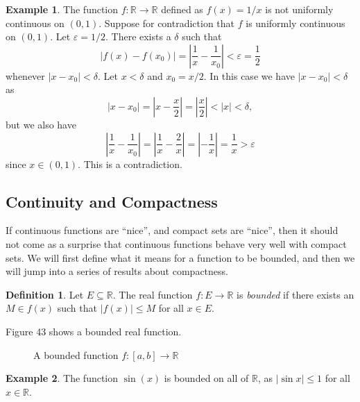 \documentclass{article}
\newcommand{\R}{\mathbb{R}}
\newcommand{\abs}[1]{\left\lvert#1\right\rvert}
\theoremstyle{definition}
\newtheorem{definition}{Definition}[section]
\newtheorem{example}{Example}[section]
\begin{document}
	\begin{example}
		The function $ f:\R\to\R $ defined as $ f(x)=1/x $ is not uniformly continuous on $ (0,1) $. Suppose for contradiction that $ f $ is uniformly continuous on $ (0,1) $. Let $ \varepsilon=1/2 $. There exists a $ \delta $ such that $$ |f(x)-f(x_0)|=\left\lvert\frac{1}{x}-\frac{1}{x_0}\right\rvert<\varepsilon=\frac{1}{2} $$ whenever $\abs{x - x_0} < \delta$. Let $x < \delta$ and $x_0 = x/2$. In this case we have $|x-x_0|<\delta$ as 
		$$ \abs{x-x_0}=\abs{x-\frac{x}{2}} = \abs{\frac{x}{2}} < \abs{x} < \delta,$$ but we also have  
		$$ \left\lvert\frac{1}{x}-\frac{1}{x_0}\right\rvert = \left\lvert\frac{1}{x}-\frac{2}{x}\right\rvert = \abs{-\frac{1}{x}} = \frac{1}{x} > \varepsilon$$ since $x\in (0,1)$. This is a contradiction.
	\end{example}
	\subsection{Continuity and Compactness}
	If continuous functions are ``nice'', and compact sets are ``nice'', then it should not come as a surprise that continuous functions behave very well with compact sets. We will first define what it means for a function to be bounded, and then we will jump into a series of results about compactness.
	\begin{definition}\label{def4.4}
		Let $ E\subseteq\R $. The real function $ f:E\to\R $ is \textit{\color{red}bounded} if there exists an $ M\in f(x) $ such that $ |f(x)|\le M $ for all $ x\in E $.
	\end{definition}
	Figure 43 shows a bounded real function.
	\begin{figure}[h!]
		\centering
		\caption{A bounded function $ f:[a,b]\to\R $ }
	\end{figure}
	\begin{example}
		The function $ \sin (x) $ is bounded on all of $ \R $, as $ |\sin x|\le 1 $ for all $ x\in\R $.
	\end{example}
\end{document}
